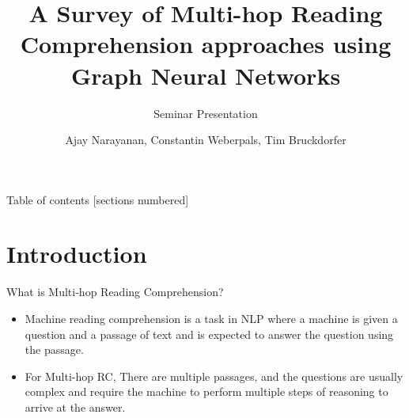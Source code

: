 \documentclass[10pt]{beamer}
\title{A Survey of Multi-hop Reading Comprehension approaches using Graph Neural Networks}
\subtitle{Seminar Presentation}
\date{}
\author{Ajay Narayanan, Constantin Weberpals, Tim Bruckdorfer}
\institute{Technical University of Munich}
\newcommand{\themename}{\textbf{\textsc{metropolis}}\xspace}
\begin{document}
\maketitle

\begin{frame}{Table of contents}
  [sections numbered]
  \tableofcontents[hideallsubsections]
\end{frame}

\section[Intro]{Introduction}

\begin{frame}[fragile]{What is Multi-hop Reading Comprehension?}




  \begin{itemize}
    \item Machine reading comprehension is a task in NLP where a machine is given a question and a passage of text and is expected to answer the question using the passage.
    \item For Multi-hop RC, There are multiple passages, and the questions are usually complex and require the machine to perform multiple steps of reasoning to arrive at the answer.
    
  \end{itemize}
\end{frame}
\end{document}
